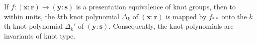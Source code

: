 If $f: (\mathbf{x}:\mathbf{r}) \to (\mathbf{y}:\mathbf{s})$ is a presentation equivalence of knot groups, then to within units, the $k$th knot polynomial $\Delta_k$ of $(\mathbf{x}:\mathbf{r})$ is mapped by $f_{**}$ onto the $k$th knot polynomial $\Delta_k'$ of $(\mathbf{y}:\mathbf{s})$. Consequently, the knot polynomials are invariants of knot type.
